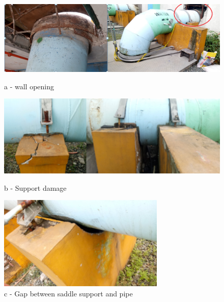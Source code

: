 \begin{figure}[!htb]
	\begin{minipage}[b]{0.5\linewidth}
		\centering
		\includegraphics[width=\textwidth]{figures/ch04_settlement}
		\caption*{a - wall opening}
	\end{minipage}
	\hspace{0.05cm}
	\begin{minipage}[b]{0.5\linewidth}
		\centering
		\includegraphics[width=\textwidth]{figures/ch04_settlement01}
		\caption*{b - Support damage}
	\end{minipage}
	\hspace{0.05cm}
\begin{minipage}[b]{0.5\linewidth}
	\centering
	\includegraphics[width=\textwidth]{figures/ch04_settlement02}
	\caption*{c - Gap between saddle support and pipe}
\end{minipage}

\end{figure}
